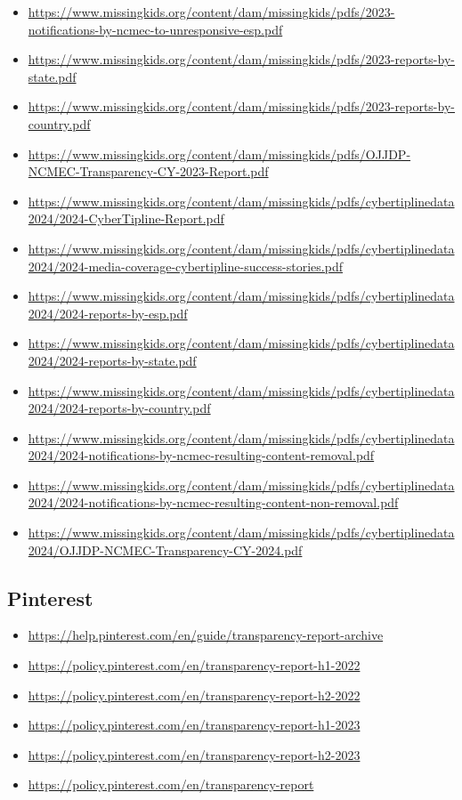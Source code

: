{{\begin{itemize}
\item[]\url{https://www.missingkids.org/content/dam/missingkids/pdfs/2023-notifications-by-ncmec-to-unresponsive-esp.pdf}
\item[]\url{https://www.missingkids.org/content/dam/missingkids/pdfs/2023-reports-by-state.pdf}
\item[]\url{https://www.missingkids.org/content/dam/missingkids/pdfs/2023-reports-by-country.pdf}
\item[]\url{https://www.missingkids.org/content/dam/missingkids/pdfs/OJJDP-NCMEC-Transparency-CY-2023-Report.pdf}
\item[]\url{https://www.missingkids.org/content/dam/missingkids/pdfs/cybertiplinedata2024/2024-CyberTipline-Report.pdf}
\item[]\url{https://www.missingkids.org/content/dam/missingkids/pdfs/cybertiplinedata2024/2024-media-coverage-cybertipline-success-stories.pdf}
\item[]\url{https://www.missingkids.org/content/dam/missingkids/pdfs/cybertiplinedata2024/2024-reports-by-esp.pdf}
\item[]\url{https://www.missingkids.org/content/dam/missingkids/pdfs/cybertiplinedata2024/2024-reports-by-state.pdf}
\item[]\url{https://www.missingkids.org/content/dam/missingkids/pdfs/cybertiplinedata2024/2024-reports-by-country.pdf}
\item[]\url{https://www.missingkids.org/content/dam/missingkids/pdfs/cybertiplinedata2024/2024-notifications-by-ncmec-resulting-content-removal.pdf}
\item[]\url{https://www.missingkids.org/content/dam/missingkids/pdfs/cybertiplinedata2024/2024-notifications-by-ncmec-resulting-content-non-removal.pdf}
\item[]\url{https://www.missingkids.org/content/dam/missingkids/pdfs/cybertiplinedata2024/OJJDP-NCMEC-Transparency-CY-2024.pdf}
\end{itemize}
}


\subsection*{Pinterest}
{\footnotesize
\begin{itemize}
\item[]\url{https://help.pinterest.com/en/guide/transparency-report-archive}
\item[]\url{https://policy.pinterest.com/en/transparency-report-h1-2022}
\item[]\url{https://policy.pinterest.com/en/transparency-report-h2-2022}
\item[]\url{https://policy.pinterest.com/en/transparency-report-h1-2023}
\item[]\url{https://policy.pinterest.com/en/transparency-report-h2-2023}
\item[]\url{https://policy.pinterest.com/en/transparency-report}
\end{itemize}
}


}
